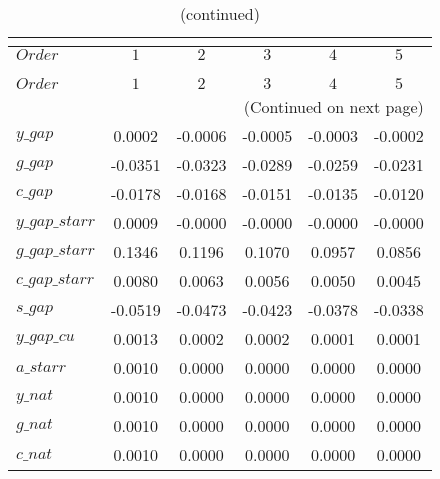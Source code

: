  
\begin{center}
\begin{longtable}{lccccc} 
\caption{COEFFICIENTS OF AUTOCORRELATION}\\
 \label{Table:th_autocorr_matrix}\\
\toprule 
$Order          $	 & 	 $          1$	 & 	 $          2$	 & 	 $          3$	 & 	 $          4$	 & 	 $          5$\\
\midrule \endfirsthead 
\caption{(continued)}\\
 \toprule \\ 
$Order          $	 & 	 $          1$	 & 	 $          2$	 & 	 $          3$	 & 	 $          4$	 & 	 $          5$\\
\midrule \endhead 
\midrule \multicolumn{6}{r}{(Continued on next page)} \\ \bottomrule \endfoot 
\bottomrule \endlastfoot 
$y\_gap         $	 & 	     0.0002	 & 	    -0.0006	 & 	    -0.0005	 & 	    -0.0003	 & 	    -0.0002 \\ 
$g\_gap         $	 & 	    -0.0351	 & 	    -0.0323	 & 	    -0.0289	 & 	    -0.0259	 & 	    -0.0231 \\ 
$c\_gap         $	 & 	    -0.0178	 & 	    -0.0168	 & 	    -0.0151	 & 	    -0.0135	 & 	    -0.0120 \\ 
$y\_gap\_starr  $	 & 	     0.0009	 & 	    -0.0000	 & 	    -0.0000	 & 	    -0.0000	 & 	    -0.0000 \\ 
$g\_gap\_starr  $	 & 	     0.1346	 & 	     0.1196	 & 	     0.1070	 & 	     0.0957	 & 	     0.0856 \\ 
$c\_gap\_starr  $	 & 	     0.0080	 & 	     0.0063	 & 	     0.0056	 & 	     0.0050	 & 	     0.0045 \\ 
$s\_gap         $	 & 	    -0.0519	 & 	    -0.0473	 & 	    -0.0423	 & 	    -0.0378	 & 	    -0.0338 \\ 
$y\_gap\_cu     $	 & 	     0.0013	 & 	     0.0002	 & 	     0.0002	 & 	     0.0001	 & 	     0.0001 \\ 
$a\_starr       $	 & 	     0.0010	 & 	     0.0000	 & 	     0.0000	 & 	     0.0000	 & 	     0.0000 \\ 
$y\_nat         $	 & 	     0.0010	 & 	     0.0000	 & 	     0.0000	 & 	     0.0000	 & 	     0.0000 \\ 
$g\_nat         $	 & 	     0.0010	 & 	     0.0000	 & 	     0.0000	 & 	     0.0000	 & 	     0.0000 \\ 
$c\_nat         $	 & 	     0.0010	 & 	     0.0000	 & 	     0.0000	 & 	     0.0000	 & 	     0.0000 \\ 

\end{longtable}
\end{center}
